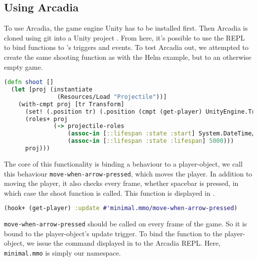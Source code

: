 \subsection{Using Arcadia}
To use Arcadia, the game engine Unity has to be installed first. Then Arcadia is cloned using git into a Unity project \cite{arcadia-test:github}.
From here, it's possible to use the \ac{REPL} to bind functions to \unity's triggers and events.
To test Arcadia out, we attempted to create the same shooting function as with the Helm example, but to an otherwise empty game.

\begin{lstlisting}[language=clojure,label={lst:clojure:shoot},caption={Arcadia Shoot}]
(defn shoot []
  (let [proj (instantiate
               (Resources/Load "Projectile"))] 
    (with-cmpt proj [tr Transform] 
      (set! (.position tr) (.position (cmpt (get-player) UnityEngine.Transform)))
      (roles+ proj
              (-> projectile-roles
                  (assoc-in [::lifespan :state :start] System.DateTime/Now)
                  (assoc-in [::lifespan :state :lifespan] 5000)))
      proj)))
\end{lstlisting}

The core of this functionality is binding a behaviour to a player-object, we call this behaviour \texttt{move-when-arrow-pressed}, which moves the player. In addition to moving the player, it also checks every frame, whether spacebar is pressed, in which case the shoot function is called. 
This function is displayed in .

\begin{lstlisting}[language=clojure,label={lst:clojure:repl},caption={Arcadia Shoot}]
(hook+ (get-player) :update #'minimal.mmo/move-when-arrow-pressed)
\end{lstlisting}

\texttt{move-when-arrow-pressed} should be called on every frame of the game.
So it is bound to the player-object's update trigger.
To bind the function to the player-object, we issue the command displayed in  to the Arcadia REPL.
Here, \texttt{minimal.mmo} is simply our namespace.
